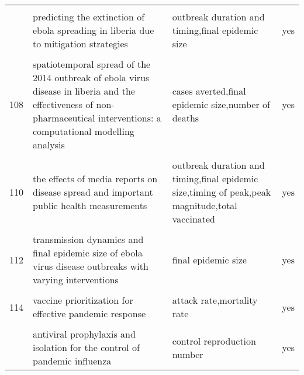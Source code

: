 \documentclass[
]{article}
\begin{document}
\begin{landscape}
\begin{longtable}{l>{\raggedright\arraybackslash}p{4cm}>{\raggedright\arraybackslash}p{6cm}l}
\cellcolor{gray!6}{105} & \cellcolor{gray!6}{optimal intervention strategies for a seir control model of ebola epidemics} & \cellcolor{gray!6}{cost,total fraction of infected and exposed} & \cellcolor{gray!6}{no}\\
\addlinespace
106 & predicting the extinction of ebola spreading in liberia due to mitigation strategies & outbreak duration and timing,final epidemic size & yes\\
\cellcolor{gray!6}{107} & \cellcolor{gray!6}{school closure strategies for the 2009 hong kong hini influenza pandemic} & \cellcolor{gray!6}{outbreak duration and timing,final epidemic size,timing of peak,attack rate} & \cellcolor{gray!6}{yes}\\
108 & spatiotemporal spread of the 2014 outbreak of ebola virus disease in liberia and the effectiveness of non-pharmaceutical interventions: a computational modelling analysis & cases averted,final epidemic size,number of deaths & yes\\
\cellcolor{gray!6}{109} & \cellcolor{gray!6}{strategies for early vaccination during novel influenza outbreaks} & \cellcolor{gray!6}{attack rate,hospitalizations} & \cellcolor{gray!6}{no}\\
110 & the effects of media reports on disease spread and important public health measurements & outbreak duration and timing,final epidemic size,timing of peak,peak magnitude,total vaccinated & yes\\
\addlinespace
\cellcolor{gray!6}{111} & \cellcolor{gray!6}{the impact of human behavioral changes in 2014 west africa ebola outbreak} & \cellcolor{gray!6}{r0} & \cellcolor{gray!6}{yes}\\
112 & transmission dynamics and final epidemic size of ebola virus disease outbreaks with varying interventions & final epidemic size & yes\\
\cellcolor{gray!6}{113} & \cellcolor{gray!6}{treatment–donation-stockpile dynamics in ebola convalescent blood transfusion therapy} & \cellcolor{gray!6}{case fatality} & \cellcolor{gray!6}{no}\\
114 & vaccine prioritization for effective pandemic response & attack rate,mortality rate & yes\\
\cellcolor{gray!6}{115} & \cellcolor{gray!6}{a mathematical study of a tb model with treatment interruptions and two latent periods} & \cellcolor{gray!6}{control reproduction number} & \cellcolor{gray!6}{no}\\
\addlinespace
116 & antiviral prophylaxis and isolation for the control of pandemic influenza & control reproduction number & yes\\

\end{longtable}
\end{landscape}
\end{document}
